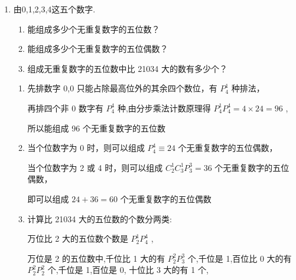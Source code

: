\begin{enumerate}
\begin{enumerate}
\begin{jieda}
              甲排在第五名，则有 $P_{3}^{1}P_{3}^{3} = {18}$ 种排法;
            
              甲没有排在第五名，则甲、乙有 $P_{3}^{2}$ 种排法，其余人全排列，故有 $P_{3}^{2}P_{3}^{3} = {36}$ 种排法；
            
            综上可得一共有 ${18} + {36} = {54}$ 种不同的排法.
        \end{jieda}

        
        \item 由0,1,2,3,4这五个数字.
        \begin{enumerate}
            \item 能组成多少个无重复数字的五位数？
            
            \item 能组成多少个无重复数字的五位偶数？
            
            \item 组成无重复数字的五位数中比 21034 大的数有多少个？
        \end{enumerate}
        \begin{jieda}
            \begin{enumerate}
                \item 先排数字 0,0 只能占除最高位外的其余四个数位，有 $P_{4}^{1}$ 种排法，
                
                再排四个非 0 数字有 $P_{4}^{4}$ 种,由分步乘法计数原理得 $P_{4}^{1}P_{4}^{4} = 4 \times  {24} = {96}$ ,
                
                所以能组成 96 个无重复数字的五位数
                \item 当个位数字为 0 时，则可以组成 $P_{4}^{4} \equiv  {24}$ 个无重复数字的五位偶数，
                
                当个位数字为 2 或 4 时，则可以组成 ${{C}}_{2}^{1}{{C}}_{3}^{1}P_{3}^{3} = {36}$ 个无重复数字的五位偶数，
                
                即可以组成 ${24} + {36} = {60}$ 个无重复数字的五位偶数

                \item 计算比 21034 大的五位数的个数分两类:
                
                万位比 2 大的五位数个数是 $P_{2}^{1}P_{4}^{4}$ ,
                
                万位是 2 的五位数中,千位比 1 大的有 $P_{2}^{2}P_{3}^{3}$ 个,千位是 1,百位比 0 大的有 $P_{2}^{2}P_{2}^{2}$ 个,千位是 1,百位是 0, 十位比 3 大的有 1 个,
                

\end{enumerate}
\end{jieda}
\end{enumerate}
\end{enumerate}
